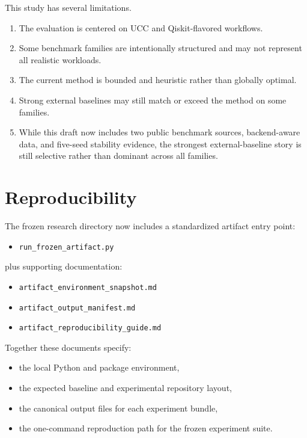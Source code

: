 \documentclass[11pt]{article}
\begin{document}
This study has several limitations.
\begin{enumerate}[leftmargin=1.5em]
    \item The evaluation is centered on UCC and Qiskit-flavored workflows.
    \item Some benchmark families are intentionally structured and may not represent all realistic workloads.
    \item The current method is bounded and heuristic rather than globally optimal.
    \item Strong external baselines may still match or exceed the method on some families.
    \item While this draft now includes two public benchmark sources, backend-aware data, and five-seed stability evidence, the strongest external-baseline story is still selective rather than dominant across all families.
\end{enumerate}

\section{Reproducibility}

The frozen research directory now includes a standardized artifact entry point:
\begin{itemize}[leftmargin=1.5em]
    \item \texttt{run\_frozen\_artifact.py}
\end{itemize}
plus supporting documentation:
\begin{itemize}[leftmargin=1.5em]
    \item \texttt{artifact\_environment\_snapshot.md}
    \item \texttt{artifact\_output\_manifest.md}
    \item \texttt{artifact\_reproducibility\_guide.md}
\end{itemize}

Together these documents specify:
\begin{itemize}[leftmargin=1.5em]
    \item the local Python and package environment,
    \item the expected baseline and experimental repository layout,
    \item the canonical output files for each experiment bundle,
    \item the one-command reproduction path for the frozen experiment suite.
\end{itemize}
\end{document}
